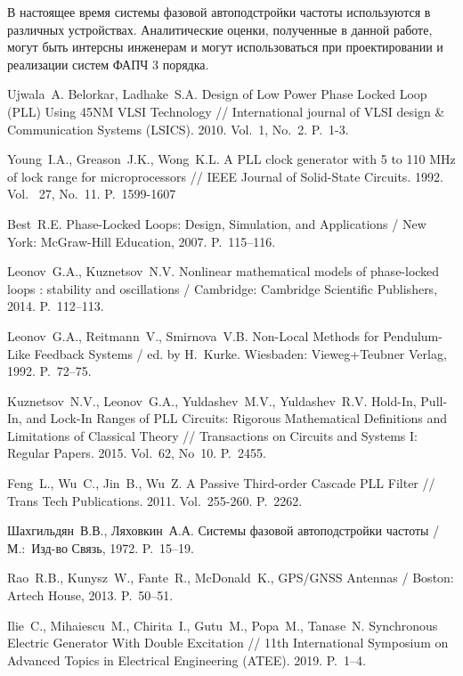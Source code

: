 \documentclass[a4paper,14pt]{article} %
\begin{document}
 В настоящее время системы фазовой автоподстройки частоты используются в различных устройствах. Аналитические оценки, полученные в данной работе, могут быть интерсны инженерам и могут использоваться при проектировании и реализации систем ФАПЧ 3 порядка.
 
\pagebreak
\begin{thebibliography}{20}
Ujwala~A. Belorkar, Ladhake~S.\:A. Design of Low Power Phase Locked Loop (PLL) Using 45NM VLSI Technology // International journal of VLSI design \& Communication Systems  (LSICS). 2010. Vol.~1, No.~2. P.~1-3.

Young~I.\:A., Greason~J.\:K., Wong~K.\:L. A PLL clock generator with 5 to 110 MHz of lock range for microprocessors //  IEEE Journal of Solid-State Circuits. 1992. Vol.~ 27, No.~11. P.~1599-1607
 
  Best~R.\:E. Phase-Locked Loops: Design, Simulation, and Applications / New York: McGraw-Hill Education, 2007. P.~115--116.
 
  Leonov~G.\:A., Kuznetsov~N.\:V. Nonlinear mathematical models of phase-locked loops : stability and oscillations / Cambridge: Cambridge Scientific Publishers, 2014. P.~112--113.

  Leonov~G.\:A., Reitmann~V., Smirnova~V.\:B. Non-Local Methods for Pendulum-Like Feedback Systems / ed. by H.~Kurke. Wiesbaden: Vieweg+Teubner Verlag, 1992. P.~72--75.

 Kuznetsov~N.\:V., Leonov~G.\:A., Yuldashev~M.\:V., Yuldashev~R.\:V. Hold-In, Pull-In, and Lock-In Ranges of PLL Circuits: Rigorous Mathematical Definitions and Limitations of Classical Theory // Transactions on Circuits and Systems I: Regular Papers. 2015. Vol.~62, No~10. P.~2455.

 Feng~L., Wu~C., Jin~B., Wu~Z. A Passive Third-order Cascade PLL Filter // Trans Tech Publications. 2011. Vol.~255-260. P.~2262.

  Шахгильдян~В.\:В., Ляховкин~А.\:А. Системы фазовой автоподстройки частоты / М.:~Изд-во Связь, 1972. P.~15--19.

  Rao~R.\:B., Kunysz~W., Fante~R., McDonald~K., GPS/GNSS Antennas / Boston: Artech House, 2013. P.~50--51.

 Ilie~C., Mihaiescu~M., Chirita~I., Gutu~M., Popa~M., Tanase~N. Synchronous Electric Generator With Double Excitation // 11th International Symposium on Advanced Topics in Electrical Engineering (ATEE). 2019. P.~1--4.


\end{thebibliography}
\end{document}
